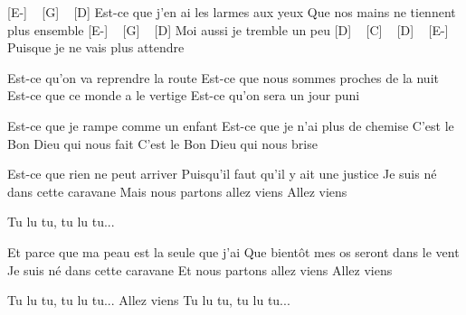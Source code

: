 

[E-] ~ [G] ~ [D]
Est-ce que j'en ai les larmes aux yeux
Que nos mains ne tiennent plus ensemble
[E-] ~ [G] ~ [D]
Moi aussi je tremble un peu
[D] ~ [C] ~ [D] ~ [E-]
Puisque je ne vais plus attendre


Est-ce qu'on va reprendre la route
Est-ce que nous sommes proches de la nuit
Est-ce que ce monde a le vertige
Est-ce qu'on sera un jour puni

Est-ce que je rampe comme un enfant
Est-ce que je n'ai plus de chemise
C'est le Bon Dieu qui nous fait
C'est le Bon Dieu qui nous brise

Est-ce que rien ne peut arriver
Puisqu'il faut qu'il y ait une justice
Je suis né dans cette caravane
Mais nous partons allez viens
Allez viens

Tu lu tu, tu lu tu...


Et parce que ma peau est la seule que j'ai
Que bientôt mes os seront dans le vent
Je suis né dans cette caravane
Et nous partons allez viens
Allez viens

Tu lu tu, tu lu tu...
Allez viens
Tu lu tu, tu lu tu... 